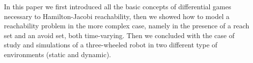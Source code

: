 In this paper we first introduced all the basic concepts of differential games necessary to Hamilton-Jacobi reachability, then we showed how to model a reachability problem in the more complex case, namely in the presence of  a reach set and an avoid set, both time-varying. Then we concluded with the case of study and simulations of a three-wheeled robot in two different type of environments (static and dynamic).